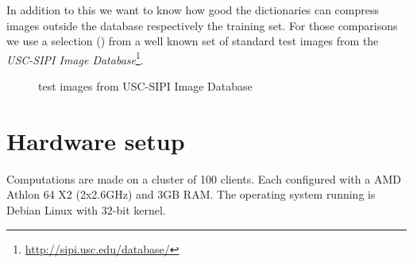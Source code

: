 In addition to this we want to know how good the dictionaries can compress
images outside the database respectively the training set. For
those comparisons we use a selection () from a
well known set of standard test images from the \emph{USC-SIPI Image
Database}\footnote{\url{http://sipi.usc.edu/database/}}. 
\begin{figure}[H]
\centering
\hspace{5mm}
\hspace{5mm}
\caption{test images from USC-SIPI Image Database}
\label{fig:USC-SIPI}
\end{figure}

\section{Hardware setup} 
Computations are made on a cluster of 100 clients. Each 
configured with a AMD Athlon 64 X2 (2x2.6GHz) and 3GB RAM.
The operating system running is Debian Linux with 32-bit kernel. 

